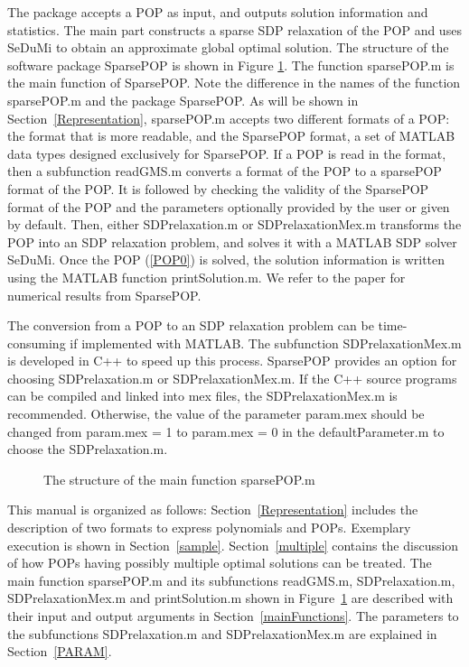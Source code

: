 The package accepts a POP as input, and outputs 
solution information and statistics. The main part 
constructs a sparse SDP relaxation  of  the POP  and uses
SeDuMi \cite{STRUM99} to obtain an approximate global optimal solution.
The structure of the software package SparsePOP is shown in Figure \ref{structure}. 
The function sparsePOP.m is the main function of SparsePOP. 
Note the difference in the names of the function sparsePOP.m and 
the package SparsePOP.
As %
will be shown in Section~\ref{Representation},
sparsePOP.m accepts two different formats of a POP:
the \GMS format \cite{GAMS} that is more readable,
and  the SparsePOP format, a set of 
MATLAB data types designed exclusively for SparsePOP. If a POP is read in the \GMS format, 
then a subfunction readGMS.m %
 converts a \GMS format of the POP 
to a sparsePOP format of the POP.  It is followed by checking the validity  of 
the SparsePOP format of the POP and the parameters optionally 
provided by the user or given by default.  Then, either SDPrelaxation.m or SDPrelaxationMex.m 
transforms the POP into an SDP relaxation problem, and solves it with a MATLAB SDP solver 
SeDuMi. Once the POP (\ref{POP0}) is solved, 
the solution information is written using the MATLAB function printSolution.m. We refer to the paper 
\cite{WAKI04} for numerical results from SparsePOP. 

The conversion from a POP to an SDP relaxation problem can be time-consuming if implemented
with MATLAB. The subfunction SDPrelaxationMex.m is developed in C++ to speed up this process.
SparsePOP provides an option for choosing SDPrelaxation.m or SDPrelaxationMex.m.
If   the C++ source programs can be compiled and linked
into mex files,  the SDPrelaxationMex.m is recommended.  Otherwise,
the value of the parameter {\sf param.mex} should be changed
from {\sf param.mex = 1} to {\sf param.mex = 0} in the defaultParameter.m to choose the 
SDPrelaxation.m.
 
\begin{figure}
\label{structure}
\begin{center}
\caption{The structure of the main function sparsePOP.m}
\end{center}
\end{figure}
 

This manual is organized as follows:
 Section~\ref{Representation} includes the description of 
two formats to express polynomials and POPs. %
Exemplary execution is shown in Section~\ref{sample}. %
Section~\ref{multiple} contains the discussion of
how  POPs having possibly  multiple optimal solutions can be treated. 
The main  function 
sparsePOP.m and its  subfunctions readGMS.m, SDPrelaxation.m, SDPrelaxationMex.m 
and printSolution.m shown in Figure~\ref{structure} are described with their
input and output arguments in Section~\ref{mainFunctions}. 
The parameters %
to the subfunctions SDPrelaxation.m and SDPrelaxationMex.m
are explained in Section~\ref{PARAM}.
